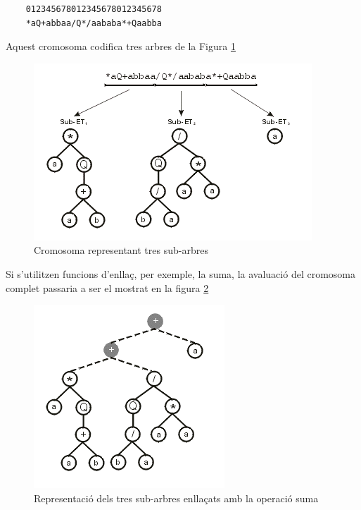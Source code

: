 	\begin{center}
	\begin{verbatim}
	012345678012345678012345678 	 
	*aQ+abbaa/Q*/aababa*+Qaabba
	\end{verbatim}
	\end{center}


Aquest cromosoma codifica tres arbres de la Figura \ref{fig:tres sub-et}

\begin{figure}[h!]
\begin{center}
\includegraphics{geptut/pt03a.png}
\end{center}
\caption{Cromosoma representant tres sub-arbres}
\label{fig:tres sub-et}
\end{figure}

Si s'utilitzen funcions d'enllaç, per exemple, la suma, la avaluació del
cromosoma complet passaria a ser el mostrat en la figura 
\ref{fig:tres sub-et amb link}

\begin{figure}[h!]
\begin{center}
\includegraphics{geptut/pt03b.png}
\end{center}
\caption{Representació dels tres sub-arbres enllaçats amb la operació suma}
\label{fig:tres sub-et amb link}
\end{figure}

